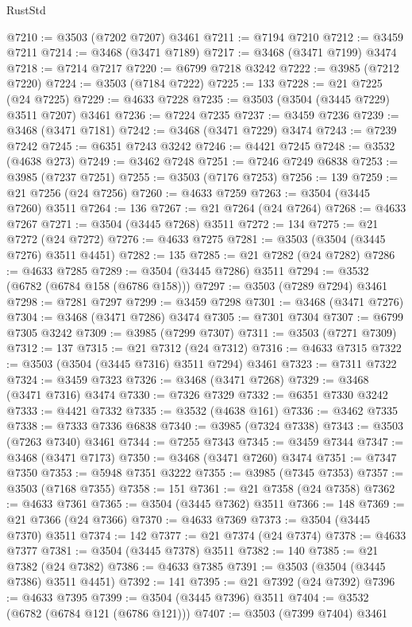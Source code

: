 \begin{lexlean}{RustStd}
\begin{coremodule}
@7210 := @3503 (@7202 @7207) @3461
@7211 := @7194 @7210
@7212 := @3459 @7211
@7214 := @3468 (@3471 @7189)
@7217 := @3468 (@3471 @7199) @3474
@7218 := @7214 @7217
@7220 := @6799 @7218 @3242
@7222 := @3985 (@7212 @7220)
@7224 := @3503 (@7184 @7222)
@7225 := 133
@7228 := @21 @7225 (@24 @7225)
@7229 := @4633 @7228
@7235 := @3503 (@3504 (@3445 @7229) @3511 @7207) @3461
@7236 := @7224 @7235
@7237 := @3459 @7236
@7239 := @3468 (@3471 @7181)
@7242 := @3468 (@3471 @7229) @3474
@7243 := @7239 @7242
@7245 := @6351 @7243 @3242
@7246 := @4421 @7245
@7248 := @3532 (@4638 @273)
@7249 := @3462 @7248
@7251 := @7246 @7249 @6838
@7253 := @3985 (@7237 @7251)
@7255 := @3503 (@7176 @7253)
@7256 := 139
@7259 := @21 @7256 (@24 @7256)
@7260 := @4633 @7259
@7263 := @3504 (@3445 @7260) @3511
@7264 := 136
@7267 := @21 @7264 (@24 @7264)
@7268 := @4633 @7267
@7271 := @3504 (@3445 @7268) @3511
@7272 := 134
@7275 := @21 @7272 (@24 @7272)
@7276 := @4633 @7275
@7281 := @3503 (@3504 (@3445 @7276) @3511 @4451)
@7282 := 135
@7285 := @21 @7282 (@24 @7282)
@7286 := @4633 @7285
@7289 := @3504 (@3445 @7286) @3511
@7294 := @3532 (@6782 (@6784 @158 (@6786 @158)))
@7297 := @3503 (@7289 @7294) @3461
@7298 := @7281 @7297
@7299 := @3459 @7298
@7301 := @3468 (@3471 @7276)
@7304 := @3468 (@3471 @7286) @3474
@7305 := @7301 @7304
@7307 := @6799 @7305 @3242
@7309 := @3985 (@7299 @7307)
@7311 := @3503 (@7271 @7309)
@7312 := 137
@7315 := @21 @7312 (@24 @7312)
@7316 := @4633 @7315
@7322 := @3503 (@3504 (@3445 @7316) @3511 @7294) @3461
@7323 := @7311 @7322
@7324 := @3459 @7323
@7326 := @3468 (@3471 @7268)
@7329 := @3468 (@3471 @7316) @3474
@7330 := @7326 @7329
@7332 := @6351 @7330 @3242
@7333 := @4421 @7332
@7335 := @3532 (@4638 @161)
@7336 := @3462 @7335
@7338 := @7333 @7336 @6838
@7340 := @3985 (@7324 @7338)
@7343 := @3503 (@7263 @7340) @3461
@7344 := @7255 @7343
@7345 := @3459 @7344
@7347 := @3468 (@3471 @7173)
@7350 := @3468 (@3471 @7260) @3474
@7351 := @7347 @7350
@7353 := @5948 @7351 @3222
@7355 := @3985 (@7345 @7353)
@7357 := @3503 (@7168 @7355)
@7358 := 151
@7361 := @21 @7358 (@24 @7358)
@7362 := @4633 @7361
@7365 := @3504 (@3445 @7362) @3511
@7366 := 148
@7369 := @21 @7366 (@24 @7366)
@7370 := @4633 @7369
@7373 := @3504 (@3445 @7370) @3511
@7374 := 142
@7377 := @21 @7374 (@24 @7374)
@7378 := @4633 @7377
@7381 := @3504 (@3445 @7378) @3511
@7382 := 140
@7385 := @21 @7382 (@24 @7382)
@7386 := @4633 @7385
@7391 := @3503 (@3504 (@3445 @7386) @3511 @4451)
@7392 := 141
@7395 := @21 @7392 (@24 @7392)
@7396 := @4633 @7395
@7399 := @3504 (@3445 @7396) @3511
@7404 := @3532 (@6782 (@6784 @121 (@6786 @121)))
@7407 := @3503 (@7399 @7404) @3461

\end{coremodule}
\end{lexlean}
